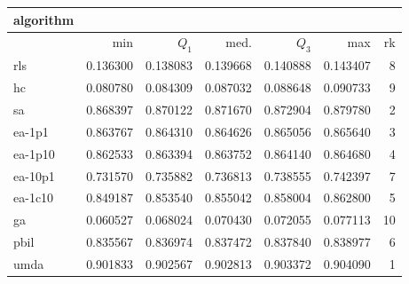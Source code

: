 \begin{tabular}{@{}l*{5}{>{{}}N{1}{3}}>{{}}N{2}{0}@{}}
\toprule
{algorithm} &  \\
\midrule
& {min} & {$Q_1$} & {med.} & {$Q_3$} & {max} & {rk}\\
\midrule
rls & 0.136300 & 0.138083 & 0.139668 & 0.140888 & 0.143407 & 8\\
hc & 0.080780 & 0.084309 & 0.087032 & 0.088648 & 0.090733 & 9\\
sa & 0.868397 & 0.870122 & 0.871670 & 0.872904 & 0.879780 & 2\\
ea-1p1 & 0.863767 & 0.864310 & 0.864626 & 0.865056 & 0.865640 & 3\\
ea-1p10 & 0.862533 & 0.863394 & 0.863752 & 0.864140 & 0.864680 & 4\\
ea-10p1 & 0.731570 & 0.735882 & 0.736813 & 0.738555 & 0.742397 & 7\\
ea-1c10 & 0.849187 & 0.853540 & 0.855042 & 0.858004 & 0.862800 & 5\\
ga & 0.060527 & 0.068024 & 0.070430 & 0.072055 & 0.077113 & 10\\
pbil & 0.835567 & 0.836974 & 0.837472 & 0.837840 & 0.838977 & 6\\
umda & {\color{blue}} 0.901833 & {\color{blue}} 0.902567 & {\color{blue}} 0.902813 & {\color{blue}} 0.903372 & {\color{blue}} 0.904090 & 1\\
\bottomrule
\end{tabular}
